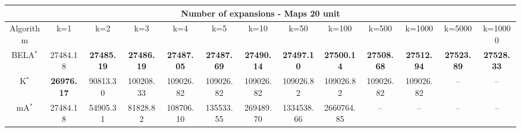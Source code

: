 \begin{tabular}{c|cccccccccccc}\toprule
\multicolumn{13}{c}{Number of expansions - Maps 20 unit}\\ \midrule
Algorithm & k=1 & k=2 & k=3 & k=4 & k=5 & k=10 & k=50 & k=100 & k=500 & k=1000 & k=5000 & k=10000 \\ \midrule
BELA$^*$ & 27484.18 & \textbf{27485.19} & \textbf{27486.19} & \textbf{27487.05} & \textbf{27487.69} & \textbf{27490.14} & \textbf{27497.10} & \textbf{27500.14} & \textbf{27508.68} & \textbf{27512.94} & \textbf{27523.89} & \textbf{27528.33} \\
K$^*$ & \textbf{26976.17} & 90813.30 & 100208.33 & 109026.82 & 109026.82 & 109026.82 & 109026.82 & 109026.82 & 109026.82 & 109026.82 & -- & -- \\
mA$^*$ & 27484.18 & 54905.31 & 81828.82 & 108706.10 & 135533.55 & 269489.70 & 1334538.66 & 2660764.85 & -- & -- & -- & -- \\ \bottomrule 
\end{tabular}
